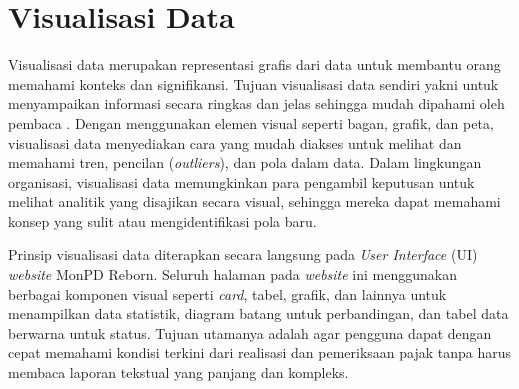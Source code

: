 \section{Visualisasi Data}
\label{sec:visualisasidata}

Visualisasi data merupakan representasi grafis dari data untuk membantu orang memahami konteks dan signifikansi. Tujuan visualisasi data sendiri yakni untuk menyampaikan informasi secara ringkas dan jelas sehingga mudah dipahami oleh pembaca \cite{alghivary2023visualisasi}. Dengan menggunakan elemen visual seperti bagan, grafik, dan peta, visualisasi data menyediakan cara yang mudah diakses untuk melihat dan memahami tren, pencilan (\emph{outliers}), dan pola dalam data. Dalam lingkungan organisasi, visualisasi data memungkinkan para pengambil keputusan untuk melihat analitik yang disajikan secara visual, sehingga mereka dapat memahami konsep yang sulit atau mengidentifikasi pola baru.

Prinsip visualisasi data diterapkan secara langsung pada \emph{User Interface} (UI) \emph{website} MonPD Reborn. Seluruh halaman pada \emph{website} ini menggunakan berbagai komponen visual seperti \emph{card}, tabel, grafik, dan lainnya untuk menampilkan data statistik, diagram batang untuk perbandingan, dan tabel data berwarna untuk status. Tujuan utamanya adalah agar pengguna dapat dengan cepat memahami kondisi terkini dari realisasi dan pemeriksaan pajak tanpa harus membaca laporan tekstual yang panjang dan kompleks.
